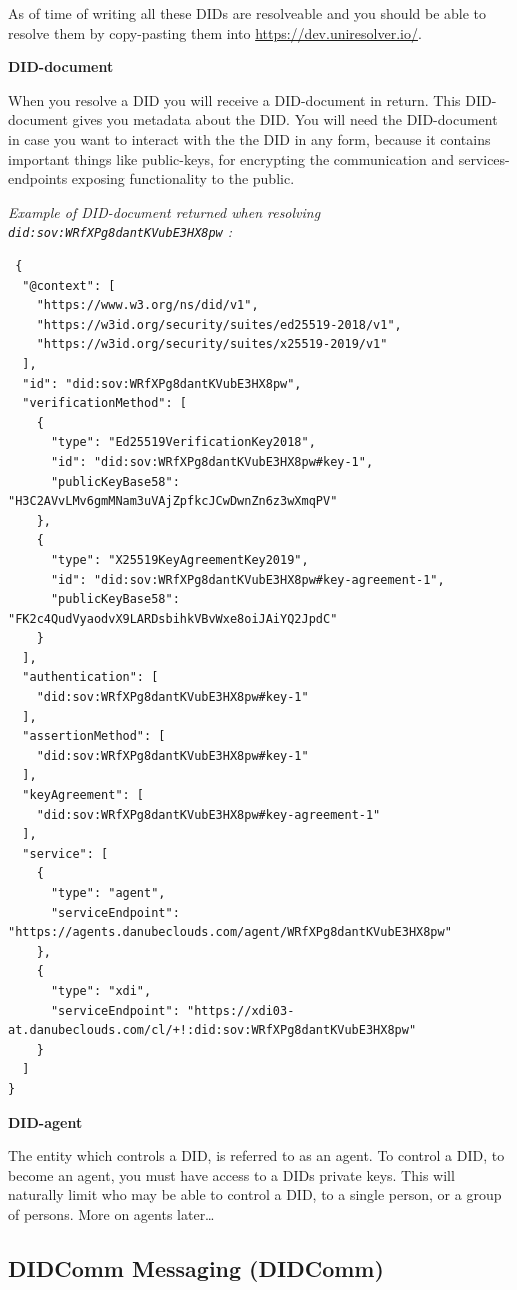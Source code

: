 As of time of writing all these DIDs are resolveable and you should be
able to resolve them by copy-pasting them into
\url{https://dev.uniresolver.io/}.

\textbf{DID-document}

When you resolve a DID you will receive a DID-document in return. This
DID-document gives you metadata about the DID. You will need the
DID-document in case you want to interact with the the DID in any form,
because it contains important things like public-keys, for encrypting
the communication and services-endpoints exposing functionality to the
public.

\emph{Example of DID-document returned when resolving
\lstinline!did:sov:WRfXPg8dantKVubE3HX8pw! :}

\begin{lstlisting}
 {
  "@context": [
    "https://www.w3.org/ns/did/v1",
    "https://w3id.org/security/suites/ed25519-2018/v1",
    "https://w3id.org/security/suites/x25519-2019/v1"
  ],
  "id": "did:sov:WRfXPg8dantKVubE3HX8pw",
  "verificationMethod": [
    {
      "type": "Ed25519VerificationKey2018",
      "id": "did:sov:WRfXPg8dantKVubE3HX8pw#key-1",
      "publicKeyBase58": "H3C2AVvLMv6gmMNam3uVAjZpfkcJCwDwnZn6z3wXmqPV"
    },
    {
      "type": "X25519KeyAgreementKey2019",
      "id": "did:sov:WRfXPg8dantKVubE3HX8pw#key-agreement-1",
      "publicKeyBase58": "FK2c4QudVyaodvX9LARDsbihkVBvWxe8oiJAiYQ2JpdC"
    }
  ],
  "authentication": [
    "did:sov:WRfXPg8dantKVubE3HX8pw#key-1"
  ],
  "assertionMethod": [
    "did:sov:WRfXPg8dantKVubE3HX8pw#key-1"
  ],
  "keyAgreement": [
    "did:sov:WRfXPg8dantKVubE3HX8pw#key-agreement-1"
  ],
  "service": [
    {
      "type": "agent",
      "serviceEndpoint": "https://agents.danubeclouds.com/agent/WRfXPg8dantKVubE3HX8pw"
    },
    {
      "type": "xdi",
      "serviceEndpoint": "https://xdi03-at.danubeclouds.com/cl/+!:did:sov:WRfXPg8dantKVubE3HX8pw"
    }
  ]
}
\end{lstlisting}

\textbf{DID-agent}

The entity which controls a DID, is referred to as an agent. To control
a DID, to become an agent, you must have access to a DIDs private keys.
This will naturally limit who may be able to control a DID, to a single
person, or a group of persons. More on agents later\ldots{}

\hypertarget{didcomm-messaging-didcomm}{%
\subsection{DIDComm Messaging
(DIDComm)}\label{didcomm-messaging-didcomm}}

